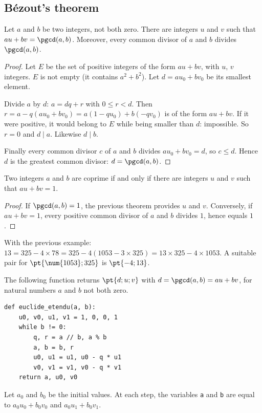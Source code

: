 \subsection{Bézout's theorem}
\begin{theorem}
Let $a$ and $b$ be two integers, not both zero. There are integers $u$ and $v$ such that $au+bv=\pgcd(a,b)$. Moreover, every common divisor of $a$ and $b$ divides $\pgcd(a,b)$.
\end{theorem}
\begin{proof}
Let $E$ be the set of positive integers of the form $au+bv$, with $u$, $v$ integers. $E$ is not empty (it contains $a^2+b^2$). Let $d=au_0+bv_0$ be its smallest element.\par
Divide $a$ by $d$: $a=dq+r$ with $0\le r<d$. Then $r=a-q(au_0+bv_0)=a(1-qu_0)+b(-qv_0)$ is of the form $au+bv$. If it were positive, it would belong to $E$ while being smaller than $d$: impossible. So $r=0$ and $d\mid a$. Likewise $d\mid b$.\par
Finally every common divisor $c$ of $a$ and $b$ divides $au_0+bv_0=d$, so $c\le d$. Hence $d$ is the greatest common divisor: $d=\pgcd(a,b)$.
\end{proof}
\begin{theorem}
Two integers $a$ and $b$ are coprime if and only if there are integers $u$ and $v$ such that $au+bv=1$.
\end{theorem}
\begin{proof}
If $\pgcd(a,b)=1$, the previous theorem provides $u$ and $v$. Conversely, if $au+bv=1$, every positive common divisor of $a$ and $b$ divides $1$, hence equals $1$.
\end{proof}
\begin{method}
With the previous example: $13=325-4\times78=325-4(\num{1053}-3\times325)=13\times325-4\times\num{1053}$. A suitable pair for $\pt{\num{1053};325}$ is $\pt{-4;13}$.
\end{method}
\begin{keypoint}
The following function returns $\pt{d;u;v}$ with $d=\pgcd(a,b)=au+bv$, for natural numbers $a$ and $b$ not both zero.
\begin{lstlisting}
def euclide_etendu(a, b):
    u0, v0, u1, v1 = 1, 0, 0, 1
    while b != 0:
        q, r = a // b, a % b
        a, b = b, r
        u0, u1 = u1, u0 - q * u1
        v0, v1 = v1, v0 - q * v1
    return a, u0, v0
\end{lstlisting}
Let $a_0$ and $b_0$ be the initial values. At each step, the variables \texttt{a} and \texttt{b} are equal to $a_0u_0+b_0v_0$ and $a_0u_1+b_0v_1$.
\end{keypoint}

